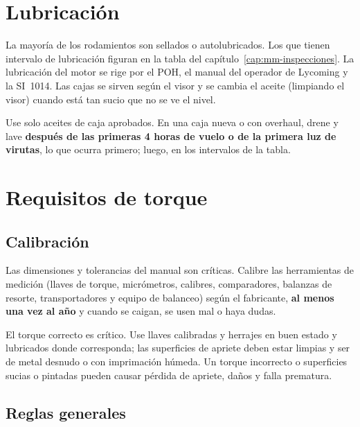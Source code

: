 \section{Lubricación}

La mayoría de los rodamientos son sellados o autolubricados. Los que tienen intervalo de lubricación figuran en la tabla del capítulo~\ref{cap:mm-inspecciones}. La lubricación del motor se rige por el POH, el manual del operador de Lycoming y la SI~1014. Las cajas se sirven según el visor y se cambia el aceite (limpiando el visor) cuando está tan sucio que no se ve el nivel.

\begin{advertencia}
Use solo aceites de caja aprobados. En una caja nueva o con overhaul, drene y lave \textbf{después de las primeras 4 horas de vuelo o de la primera luz de virutas}, lo que ocurra primero; luego, en los intervalos de la tabla.
\end{advertencia}

\section{Requisitos de torque}

\subsection{Calibración}

Las dimensiones y tolerancias del manual son críticas. Calibre las herramientas de medición (llaves de torque, micrómetros, calibres, comparadores, balanzas de resorte, transportadores y equipo de balanceo) según el fabricante, \textbf{al menos una vez al año} y cuando se caigan, se usen mal o haya dudas.

\begin{advertencia}
El torque correcto es crítico. Use llaves calibradas y herrajes en buen estado y lubricados donde corresponda; las superficies de apriete deben estar limpias y ser de metal desnudo o con imprimación húmeda. Un torque incorrecto o superficies sucias o pintadas pueden causar pérdida de apriete, daños y falla prematura.
\end{advertencia}

\subsection{Reglas generales}

